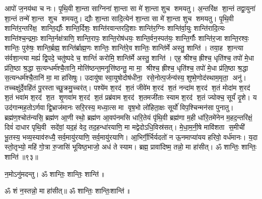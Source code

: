 आपो॑ ज॒नय॑था च नः। पृ॒थि॒वी शा॒न्ता साग्निना॑ शा॒न्ता सा मे॑ शा॒न्ता शुच शमयतु। अ॒न्तरि॑क्ष शा॒न्तं तद्वा॒युना॑ शा॒न्तं तन्मे॑ शा॒न्त शुच शमयतु। द्यौः  शा॒न्ता सादि॒त्येन॑ शा॒न्ता सा मे॑ शा॒न्ता शुच शमयतु। पृ॒थि॒वी शान्ति॑र॒न्तरि॑क्ष॒ शान्ति॒र्द्यौः  शान्ति॒र्दिशः॒ शान्ति॑रवान्तरदि॒शाः  शान्ति॑र॒ग्निः  शान्ति॑र्वा॒युः  शान्ति॑रादि॒त्यः  शान्ति॑श्च॒न्द्रमाः॒ शान्ति॒र्नक्ष॑त्राणि॒ शान्ति॒रापः॒ शान्ति॒रोष॑धयः॒ शान्ति॒र्वन॒स्पत॑यः॒ शान्ति॒र्गौः  शान्ति॑र॒जा शान्ति॒रश्वः॒ शान्तिः॒ पुरु॑षः॒ शान्ति॒र्ब्रह्म॒ शान्ति॑र्ब्राह्म॒णः  शान्तिः॒ शान्ति॑रे॒व शान्तिः॒ शान्ति॑र्मे अस्तु॒ शान्ति॑। तया॒ह शा॒न्त्या स॑र्वशा॒न्त्या मह्यं॑ द्वि॒पदे॒ चतु॑ष्पदे च॒ शान्तिं॑ करोमि॒ शान्ति॑र्मे अस्तु॒ शान्ति॑। एह॒ श्रीश्च॒ ह्रीश्च॒ धृति॑श्च॒ तपो॑ मे॒धा प्र॑ति॒ष्ठा श्र॒द्धा स॒त्यन्धर्म॑श्चै॒तानि॒ मोत्ति॑ष्ठन्त॒मनूत्ति॑ष्ठन्तु॒ मा मा॒ श्रीश्च॒ ह्रीश्च॒ धृति॑श्च॒ तपो॑ मे॒धा प्र॑ति॒ष्ठा श्र॒द्धा स॒त्यन्धर्म॑श्चै॒तानि॑ मा॒ मा हा॑सिषुः। उदायु॑षा स्वा॒युषोदोष॑धीना॒ रसे॒नोत्प॒र्जन्य॑स्य॒ शुष्मे॒णोद॑स्थाम॒मृता॒ अनु॑। तच्चक्षु॑र्दे॒वहि॑तं पु॒रस्ताच्छु॒क्रमु॒च्चर॑त्। पश्ये॑म श॒रद॑ श॒तं जीवे॑म श॒रद॑ श॒तं नन्दा॑म श॒रद॑ श॒तं मोदा॑म श॒रद॑ श॒तं भवा॑म श॒रद॑ श॒त शृ॒णवा॑म श॒रद॑ श॒तं प्रब्र॑वाम श॒रद॑ श॒तमजी॑ताः स्याम श॒रद॑ श॒तं ज्योक्च॒ सूर्यं॑ दृ॒शे। य उद॑गान्मह॒तोऽर्णवाद्वि॒भ्राज॑मानः सरि॒रस्य॒ मध्या॒त्स मा वृष॒भो लो॑हिता॒क्षः सूर्यो॑ विप॒श्चिन्मन॑सा पुनातु। ब्रह्म॑ण॒श्चोत॑न्यसि॒ ब्रह्म॑ण आ॒णी स्थो॒ ब्रह्म॑ण आ॒वप॑नमसि धारि॒तेयं पृ॑थि॒वी ब्रह्म॑णा म॒ही धा॑रि॒तमे॑नेन म॒हद॒न्तरि॑क्षं॒ दिवं॑ दाधार पृथि॒वी सदे॑वां॒ यद॒हं वेद॒ तद॒हन्धा॑रयाणि॒ मा मद्वेदोऽधि॒विस्र॑सत्। मे॒धा॒म॒नी॒षे मावि॑शता स॒मीची॑ भू॒तस्य॒ भव्य॒स्याव॑रुध्यै॒ सर्व॒मायु॑रयाणि॒ सर्व॒मायु॑रयाणि। आ॒भिर्गी॒र्भिर्यदतो॑ न ऊ॒नमाप्या॑यय हरिवो॒ वर्ध॑मानः। य॒दा स्तो॒तृभ्यो॒ महि॑ गो॒त्रा रु॒जासि॑ भूयिष्ठ॒भाजो॒ अध॑ ते स्याम। ब्रह्म॒ प्रावा॑दिष्म॒ तन्नो॒ मा हा॑सीत्। ॐ शान्तिः॒ शान्तिः॒ शान्ति॑॥९३॥

न॒मोऽनु॑मदन्तु। ॐ शान्तिः॒ शान्तिः॒ शान्ति॑॥ 

\closesection
\clearpage

\setcounter{anuvakam}{0}

ॐ शं न॒स्तन्नो॒ मा हा॑सीत्॥ ॐ शान्तिः॒ शान्तिः॒शान्ति॑॥

